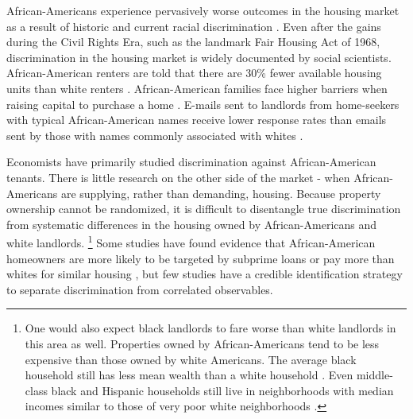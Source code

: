 African-Americans experience pervasively worse outcomes in the housing market as a result of historic and current racial discrimination \citep{krysan}. Even after the gains during the Civil Rights Era, such as the landmark Fair Housing Act of 1968, discrimination in the housing market is widely documented by social scientists. African-American renters are told that there are 30\% fewer available housing units than white renters \citep{yinger1}. African-American families face higher barriers when raising capital to purchase a home \citep{pope}. E-mails sent to landlords from home-seekers with typical African-American names receive lower response rates than emails sent by those with names commonly associated with whites \citep{hanson}.


Economists have primarily studied discrimination against African-American tenants. There is little research on the other side of the market - when African-Americans are supplying, rather than demanding, housing. Because property ownership cannot be randomized, it is difficult to disentangle true discrimination from systematic differences in the housing owned by African-Americans and white landlords.%
	\footnote{One would also expect black landlords to fare worse than white landlords in this area as well. Properties owned by African-Americans tend to be less expensive than those owned by white Americans. The average black household still has less mean wealth than a white household \citep{oliver}. Even middle-class black and Hispanic households still live in neighborhoods with median incomes similar to those of very poor white neighborhoods \citep{reardon}.} 
Some studies have found evidence that African-American homeowners are more likely to be targeted by subprime loans \citep{foreclosure} or pay more than whites for similar housing \citep{bayer, myers}, but few studies have a credible identification strategy to separate discrimination from correlated observables. 


